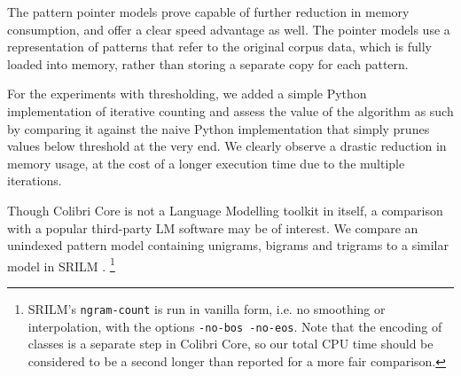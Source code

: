 \documentclass[a4paper,12pt]{article}
\begin{document}
The pattern pointer models prove capable of further reduction in memory
consumption, and offer a clear speed advantage as well. The pointer models use a
representation of patterns that refer to the original corpus data, which is
fully loaded into memory, rather than storing a separate copy for each pattern. 

For the experiments with thresholding, we added a simple Python implementation of
iterative counting and assess the value of the algorithm as such by comparing
it against the naive Python implementation that simply prunes values below
threshold at the very end. We clearly observe a drastic reduction in memory
usage, at the cost of a longer execution time due to the multiple iterations.

Though Colibri Core is not a Language Modelling toolkit in itself, a comparison
with a popular third-party LM software may be of interest. We compare an
unindexed pattern model containing unigrams, bigrams and trigrams to a similar
model in SRILM \cite{SRILM}. \footnote{SRILM's \texttt{ngram-count} is run in
vanilla form, i.e. no smoothing or interpolation, with the options \verb|-no-bos -no-eos|. Note that the
encoding of classes is a separate step in Colibri Core, so our total CPU time
should be considered to be a second longer than reported for a more fair comparison.}
\end{document}
